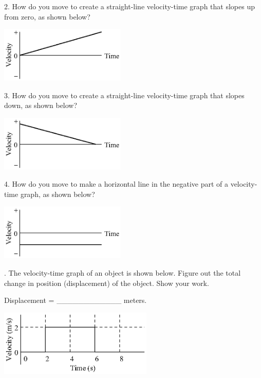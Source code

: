 2. How do you move to create a straight-line velocity-time graph that slopes
up from zero, as shown below?

\vspace{0.3cm}
{\par\raggedright \includegraphics[width=0.45\textwidth]{velocity/velocity_fig9.eps} \par}
\answerspace{0.3cm}

3. How do you move to create a straight-line velocity-time graph that slopes
down, as shown below?

\vspace{0.3cm}
{\par\raggedright \includegraphics[width=0.45\textwidth]{velocity/velocity_fig10.eps} \par}
\answerspace{0.3cm}

4. How do you move to make a horizontal line in the negative part of a velocity-time
graph, as shown below?

\vspace{0.3cm}
{\par\raggedright \includegraphics[width=0.45\textwidth]{velocity/velocity_fig11.eps} \par}
\answerspace{0.3cm}

. The velocity-time graph of an object is shown below. Figure out the total
change in position (displacement) of the object. Show your work.

Displacement = \_\_\_\_\_\_\_\_\_\_\_\_ meters.

\vspace{0.3cm}
{\par\raggedright \includegraphics[width=0.55\textwidth]{velocity/velocity_fig12.eps} \par}
\answerspace{0.6cm}

